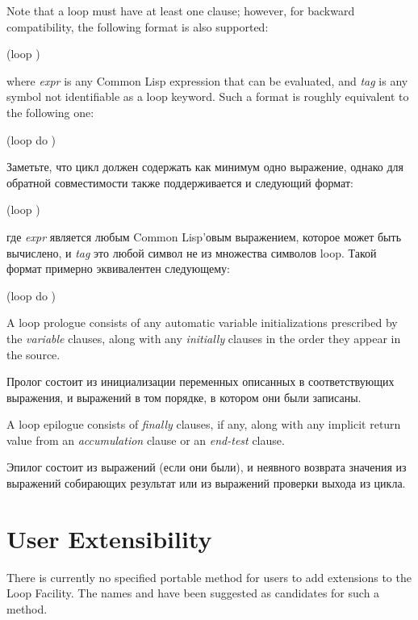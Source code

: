 Note that a loop must have at least one clause; however, for backward
compatibility, the following format is also supported:
\begin{lisp} (loop )
\end{lisp} where \emph{expr} is any Common Lisp expression that can be
evaluated, and \emph{tag} is any symbol not identifiable as a loop
keyword.  Such a format is roughly equivalent to the following one:

\begin{lisp} (loop do )
\end{lisp}

Заметьте, что цикл должен содержать как минимум одно выражение, однако
для обратной совместимости также поддерживается и следующий формат:
\begin{lisp} (loop )
\end{lisp}
где \emph{expr} является любым Common Lisp'овым выражением, которое
может быть вычислено, и \emph{tag} это любой символ не из множества
символов loop. Такой формат примерно эквивалентен следующему:

\begin{lisp} (loop do )
\end{lisp}

  A loop prologue consists of any automatic variable initializations
prescribed by the \emph{variable\/} clauses, along with any
\emph{initially\/} clauses in the order they appear in the source.

Пролог состоит из инициализации переменных описанных в соответствующих
выражения, и  выражений в том порядке, в котором они
были записаны.

  A loop epilogue consists of \emph{finally\/} clauses, if any, along
with any implicit return value from an \emph{accumulation\/} clause or
an \emph{end-test\/} clause.

Эпилог состоит из выражений  (если они были), и неявного
возврата значения из выражений собирающих результат или из выражений
проверки выхода из цикла.

  \section{User Extensibility}

  There is currently no specified portable method for users to add
extensions to the Loop Facility.  The names  and
 have been suggested as candidates for such a
method.

